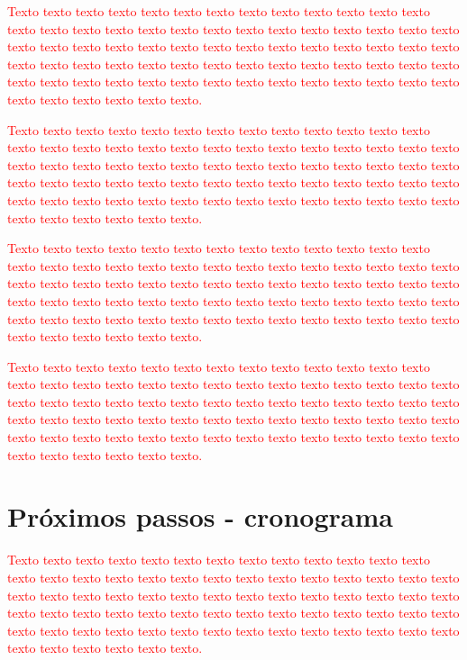 \documentclass[normaltoc, espacoumemeio, pnumromarab,ruledheader]{abnt}
\begin{document}
\textcolor{red}{Texto texto texto texto texto texto texto texto texto texto texto texto texto texto texto texto texto texto texto texto texto texto texto texto texto texto texto texto texto texto texto texto texto texto texto texto texto texto texto texto texto texto texto texto texto texto texto texto texto texto texto texto texto texto texto texto texto texto texto texto texto texto texto texto texto texto texto texto texto texto texto texto texto texto texto.}

\textcolor{red}{Texto texto texto texto texto texto texto texto texto texto texto texto texto texto texto texto texto texto texto texto texto texto texto texto texto texto texto texto texto texto texto texto texto texto texto texto texto texto texto texto texto texto texto texto texto texto texto texto texto texto texto texto texto texto texto texto texto texto texto texto texto texto texto texto texto texto texto texto texto texto texto texto texto texto texto.}

\textcolor{red}{Texto texto texto texto texto texto texto texto texto texto texto texto texto texto texto texto texto texto texto texto texto texto texto texto texto texto texto texto texto texto texto texto texto texto texto texto texto texto texto texto texto texto texto texto texto texto texto texto texto texto texto texto texto texto texto texto texto texto texto texto texto texto texto texto texto texto texto texto texto texto texto texto texto texto texto.}

\textcolor{red}{Texto texto texto texto texto texto texto texto texto texto texto texto texto texto texto texto texto texto texto texto texto texto texto texto texto texto texto texto texto texto texto texto texto texto texto texto texto texto texto texto texto texto texto texto texto texto texto texto texto texto texto texto texto texto texto texto texto texto texto texto texto texto texto texto texto texto texto texto texto texto texto texto texto texto texto.}

\section{Próximos passos - cronograma}

\textcolor{red}{Texto texto texto texto texto texto texto texto texto texto texto texto texto texto texto texto texto texto texto texto texto texto texto texto texto texto texto texto texto texto texto texto texto texto texto texto texto texto texto texto texto texto texto texto texto texto texto texto texto texto texto texto texto texto texto texto texto texto texto texto texto texto texto texto texto texto texto texto texto texto texto texto texto texto texto.}
\end{document}

